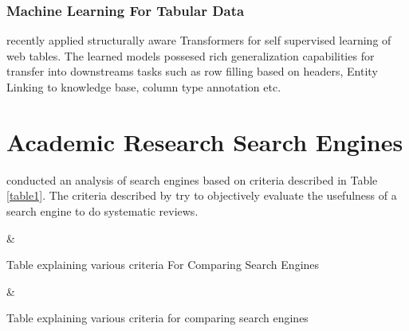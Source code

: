 \subsubsection{Machine Learning For Tabular Data}
\cite{deng2020turl} recently applied structurally aware Transformers for self supervised learning of web tables. The learned models possesed rich generalization capabilities for transfer into downstreams tasks such as row filling based on headers, Entity Linking to knowledge base, column type annotation etc. 

\section{Academic Research Search Engines}
\cite{gusenbauer2020academic} conducted an analysis of search engines based on criteria described in Table \ref{table1}.
The criteria described by \cite{gusenbauer2020academic} try to objectively evaluate the usefulness of a search engine to do systematic reviews.

\begin{table}[h]
    \label{table\arabic{tablecounter}}
            {\Criteria & \Meaning}
            \centering
            \caption{\label{tablecounter}Table explaining various criteria For Comparing Search Engines}
\end{table}

\begin{table}[h]
    \label{table\arabic{tablecounter}}
            {\Criteria & \Meaning}
            \centering
            \caption{\label{tablecounter}Table explaining various criteria for comparing search engines}
\end{table}

